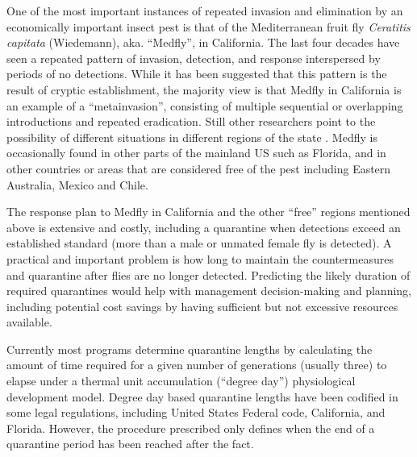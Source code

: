 \documentclass[10pt,a4paper,twocolumn]{article}
\begin{document}
One of the most important instances of repeated invasion 
and elimination by an economically important insect pest is that of 
the Mediterranean fruit fly \textit{Ceratitis capitata} (Wiedemann), aka. ``Medfly'', 
in California.  
The last four decades have seen a repeated pattern of
invasion, detection, and response 
interspersed by periods of no detections\cite{carey_establishment_1991, papadopoulos_trickle_2013}.
While it has been suggested that this pattern is the result of
cryptic establishment\cite{carey201730}, 
the majority view is
that Medfly in California is an example of 
a ``metainvasion'', consisting of multiple sequential or
overlapping introductions\cite{davies_bioinvasions_1999}
and repeated eradication\cite{haymer_genetic_1997}.
Still other researchers point to the possibility of different situations
in different regions of the state
\cite{bonizzoni_microsatellite_2001,gasperi_genetic_2002}.
Medfly is occasionally found in 
other parts of the mainland US such as Florida\cite{szyniszewska2016analysis},
and in other countries or areas that are considered 
free of the pest including Eastern Australia, Mexico and Chile\cite{mcinnis2017can}.

The response plan to Medfly in California and the other ``free'' 
regions mentioned above is extensive and costly, 
including a quarantine when detections exceed an established standard
(more than a male or unmated female fly is detected)\cite{gilbert_insect_2013}.
A practical and important problem is how long to maintain 
the countermeasures and quarantine after flies are no longer detected.
Predicting the likely duration of required quarantines would help with
management decision-making and planning,
including potential cost savings by having sufficient but not excessive
resources available.

Currently most programs determine quarantine lengths 
by calculating the amount of time required for a given number 
of generations (usually three) to elapse under a thermal unit accumulation (``degree day'')
physiological development model.
Degree day based quarantine lengths have been codified in some legal
regulations, including 
United States Federal code\cite{US-301.32-10},
California\cite{3-CA-ADC-3406}, and Florida.
However, the procedure prescribed only defines when the end of a
quarantine period has been reached after the fact.
\end{document}
